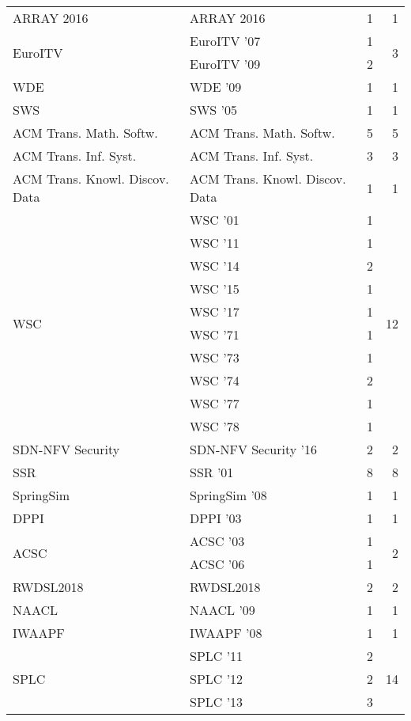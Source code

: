 \begin{table*}[t]
\begin{tabular}{llrr}
\multirow{1}{*}{ARRAY 2016} & ARRAY 2016 & 1 & \multirow{1}{*}{1}\\
\multirow{2}{*}{EuroITV } & EuroITV '07 & 1 & \multirow{2}{*}{3}\\
& EuroITV '09 & 2 &\\
\multirow{1}{*}{WDE } & WDE '09 & 1 & \multirow{1}{*}{1}\\
\multirow{1}{*}{SWS } & SWS '05 & 1 & \multirow{1}{*}{1}\\
\multirow{1}{*}{ACM Trans. Math. Softw.} & ACM Trans. Math. Softw. & 5 & \multirow{1}{*}{5}\\
\multirow{1}{*}{ACM Trans. Inf. Syst.} & ACM Trans. Inf. Syst. & 3 & \multirow{1}{*}{3}\\
\multirow{1}{*}{ACM Trans. Knowl. Discov. Data} & ACM Trans. Knowl. Discov. Data & 1 & \multirow{1}{*}{1}\\
\multirow{10}{*}{WSC } & WSC '01 & 1 & \multirow{10}{*}{12}\\
& WSC '11 & 1 &\\
& WSC '14 & 2 &\\
& WSC '15 & 1 &\\
& WSC '17 & 1 &\\
& WSC '71 & 1 &\\
& WSC '73 & 1 &\\
& WSC '74 & 2 &\\
& WSC '77 & 1 &\\
& WSC '78 & 1 &\\
\multirow{1}{*}{SDN-NFV Security } & SDN-NFV Security '16 & 2 & \multirow{1}{*}{2}\\
\multirow{1}{*}{SSR } & SSR '01 & 8 & \multirow{1}{*}{8}\\
\multirow{1}{*}{SpringSim } & SpringSim '08 & 1 & \multirow{1}{*}{1}\\
\multirow{1}{*}{DPPI } & DPPI '03 & 1 & \multirow{1}{*}{1}\\
\multirow{2}{*}{ACSC } & ACSC '03 & 1 & \multirow{2}{*}{2}\\
& ACSC '06 & 1 &\\
\multirow{1}{*}{RWDSL2018} & RWDSL2018 & 2 & \multirow{1}{*}{2}\\
\multirow{1}{*}{NAACL } & NAACL '09 & 1 & \multirow{1}{*}{1}\\
\multirow{1}{*}{IWAAPF } & IWAAPF '08 & 1 & \multirow{1}{*}{1}\\
\multirow{8}{*}{SPLC } & SPLC '11 & 2 & \multirow{8}{*}{14}\\
& SPLC '12 & 2 &\\
& SPLC '13 & 3 &\\

\end{tabular}
\end{table*}
